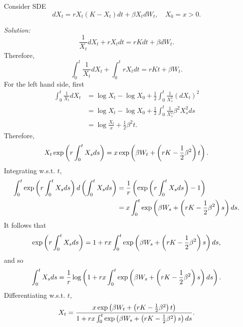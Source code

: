 \begin{exam}
    Consider SDE
    \begin{equation*}
        dX_t = rX_t(K- X_t)dt + \beta X_t dW_t,\quad X_0 = x > 0.
    \end{equation*}

    \noindent \emph{Solution:}
    \begin{equation*}
        \frac{1}{X_t}dX_t + rX_tdt =rKdt +  \beta dW_t.
    \end{equation*}
    Therefore,
    \begin{equation*}
        \int_0^t\frac{1}{X_t}dX_t + \int_0^t rX_tdt = rKt + \beta W_t.
    \end{equation*}
    For the left hand side, first
    \begin{align*}
        \int_0^t\frac{1}{X_t}dX_t &= \log X_t -\log X_0 +\frac{1}{2} \int_0^t \frac{1}{X_s^2} (dX_t)^2 \\
        &= \log X_t -\log X_0 +\frac{1}{2} \int_0^t \frac{1}{X_s^2} \beta^2 X_s^2 ds \\
        &= \log \frac{X_t}{x} + \frac{1}{2}\beta^2 t.
    \end{align*}
    Therefore,
    \begin{equation*}
        X_t\exp\left(r\int_0^tX_sds\right) = x\exp\left(\beta W_t + \left(rK - \frac{1}{2}\beta^2\right)t\right).
    \end{equation*}
    Integrating w.s.t. $t$,
    \begin{align*}
        \int_0^t \exp\left(r\int_0^tX_sds\right) d\left(\int_0^tX_sds\right) &= \frac{1}{r} \left(\exp\left(r\int_0^tX_sds\right) - 1\right)\\
        &= x\int_0^t\exp\left(\beta W_s + \left(rK - \frac{1}{2}\beta^2\right)s\right)ds.
    \end{align*}
    It follows that
    \begin{equation*}
        \exp\left(r\int_0^tX_sds\right) = 1+ rx\int_0^t\exp\left(\beta W_s + \left(rK - \frac{1}{2}\beta^2\right)s\right)ds,
    \end{equation*}
    and so
    \begin{equation*}
        \int_0^tX_sds  = \frac{1}{r}\log \left(1+ rx\int_0^t\exp\left(\beta W_s + \left(rK - \frac{1}{2}\beta^2\right)s\right)ds\right).
    \end{equation*}
    Differentiating w.s.t. $t$,
    \begin{equation*}
        X_t = \frac{x\exp\left(\beta W_t + \left(rK - \frac{1}{2}\beta^2\right)t\right)}{1+ rx\int_0^t\exp\left(\beta W_s + \left(rK - \frac{1}{2}\beta^2\right)s\right)ds}.
    \end{equation*}
\end{exam}

